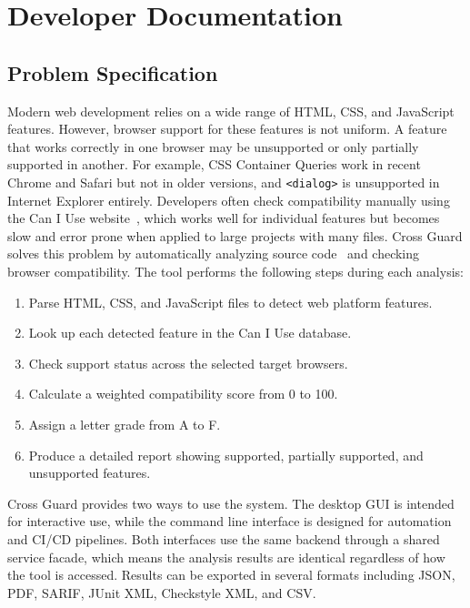 \chapter{Developer Documentation}
\label{ch:impl}

\section{Problem Specification}
\label{sec:problem-spec}

Modern web development relies on a wide range of HTML, CSS, and JavaScript features. However, browser support for these features is not uniform. A feature that works correctly in one browser may be unsupported or only partially supported in another. For example, CSS Container Queries work in recent Chrome and Safari but not in older versions, and \texttt{<dialog>} is unsupported in Internet Explorer entirely. Developers often check compatibility manually using the Can I Use website~\cite{caniuse}, which works well for individual features but becomes slow and error prone when applied to large projects with many files. Cross Guard solves this problem by automatically analyzing source code~\cite{binkley2007sca} and checking browser compatibility. The tool performs the following steps during each analysis:

\begin{enumerate}
    \item Parse HTML, CSS, and JavaScript files to detect web platform features.
    \item Look up each detected feature in the Can I Use database.
    \item Check support status across the selected target browsers.
    \item Calculate a weighted compatibility score from 0 to 100.
    \item Assign a letter grade from A to F.
    \item Produce a detailed report showing supported, partially supported, and unsupported features.
\end{enumerate}

Cross Guard provides two ways to use the system. The desktop GUI is intended for interactive use, while the command line interface is designed for automation and CI/CD pipelines. Both interfaces use the same backend through a shared service facade, which means the analysis results are identical regardless of how the tool is accessed. Results can be exported in several formats including JSON, PDF, SARIF, JUnit XML, Checkstyle XML, and CSV.

